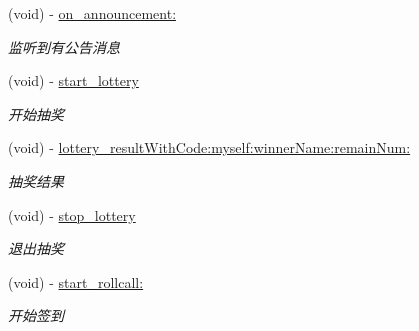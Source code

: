 \begin{DoxyCompactItemize}
\mbox{\label{protocol_request_data_delegate_01-p_a22719fac99109f874f0b3bb41a05f3df}} 
(void) -\/ \hyperlink{protocol_request_data_delegate_01-p_a22719fac99109f874f0b3bb41a05f3df}{on\+\_\+announcement\+:}
\begin{DoxyCompactList}\small\item\em 监听到有公告消息 \end{DoxyCompactList}\item 
\mbox{\label{protocol_request_data_delegate_01-p_a93f6b77f358cd9c1ce33ceb0be3f650a}} 
(void) -\/ \hyperlink{protocol_request_data_delegate_01-p_a93f6b77f358cd9c1ce33ceb0be3f650a}{start\+\_\+lottery}
\begin{DoxyCompactList}\small\item\em 开始抽奖 \end{DoxyCompactList}\item 
\mbox{\label{protocol_request_data_delegate_01-p_a4fabe787c4f14e838a4270f9bea1e683}} 
(void) -\/ \hyperlink{protocol_request_data_delegate_01-p_a4fabe787c4f14e838a4270f9bea1e683}{lottery\+\_\+result\+With\+Code\+:myself\+:winner\+Name\+:remain\+Num\+:}
\begin{DoxyCompactList}\small\item\em 抽奖结果 \end{DoxyCompactList}\item 
\mbox{\label{protocol_request_data_delegate_01-p_ab3bbc70e6feb88bf411b8eaa2636be22}} 
(void) -\/ \hyperlink{protocol_request_data_delegate_01-p_ab3bbc70e6feb88bf411b8eaa2636be22}{stop\+\_\+lottery}
\begin{DoxyCompactList}\small\item\em 退出抽奖 \end{DoxyCompactList}\item 
\mbox{\label{protocol_request_data_delegate_01-p_a2f16b21e02397c30f1f9e2a17ae74980}} 
(void) -\/ \hyperlink{protocol_request_data_delegate_01-p_a2f16b21e02397c30f1f9e2a17ae74980}{start\+\_\+rollcall\+:}
\begin{DoxyCompactList}\small\item\em 开始签到 \end{DoxyCompactList}\item 

\end{DoxyCompactItemize}
